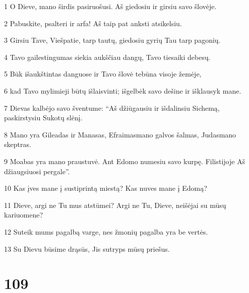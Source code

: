 \par 1 O Dieve, mano širdis pasiruošusi. Aš giedosiu ir girsiu savo šlovėje. 
\par 2 Pabuskite, psalteri ir arfa! Aš taip pat anksti atsikelsiu. 
\par 3 Girsiu Tave, Viešpatie, tarp tautų, giedosiu gyrių Tau tarp pagonių. 
\par 4 Tavo gailestingumas siekia aukščiau dangų, Tavo tiesa­iki debesų. 
\par 5 Būk išaukštintas danguose ir Tavo šlovė tebūna visoje žemėje, 
\par 6 kad Tavo mylimieji būtų išlaisvinti; išgelbėk savo dešine ir išklausyk mane. 
\par 7 Dievas kalbėjo savo šventume: “Aš džiūgausiu ir išdalinsiu Sichemą, paskirstysiu Sukotų slėnį. 
\par 8 Mano yra Gileadas ir Manasas, Efraimas­mano galvos šalmas, Judas­mano skeptras. 
\par 9 Moabas yra mano praustuvė. Ant Edomo numesiu savo kurpę. Filistijoje Aš džiaugsiuosi pergale”. 
\par 10 Kas įves mane į sustiprintą miestą? Kas nuves mane į Edomą? 
\par 11 Dieve, argi ne Tu mus atstūmei? Argi ne Tu, Dieve, neišėjai su mūsų kariuomene? 
\par 12 Suteik mums pagalbą varge, nes žmonių pagalba yra be vertės. 
\par 13 Su Dievu būsime drąsūs, Jis sutryps mūsų priešus.


\chapter{109}


